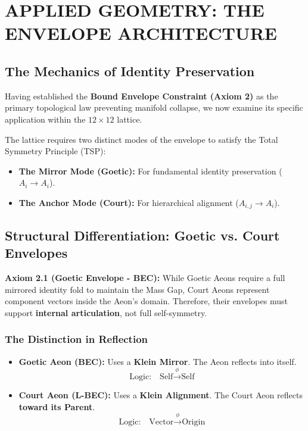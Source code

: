 \documentclass[11pt, letterpaper]{article}
\begin{document}
\section{APPLIED GEOMETRY: THE ENVELOPE ARCHITECTURE}\label{sec:partIX}
\label{sec:envelope_application}

\subsection{The Mechanics of Identity Preservation}\label{sec:9.1}
Having established the \textbf{Bound Envelope Constraint (Axiom 2)} as the primary topological law preventing manifold collapse, we now examine its specific application within the $12 \times 12$ lattice.

The lattice requires two distinct modes of the envelope to satisfy the Total Symmetry Principle (TSP):
\begin{itemize}
    \item \textbf{The Mirror Mode (Goetic):} For fundamental identity preservation ($A_i \to A_i$).
    \item \textbf{The Anchor Mode (Court):} For hierarchical alignment ($A_{i,j} \to A_i$).
\end{itemize}

\subsection{Structural Differentiation: Goetic vs. Court Envelopes}\label{sec:9.2}
\textbf{Axiom 2.1 (Goetic Envelope - BEC):}
While Goetic Aeons require a full mirrored identity fold to maintain the Mass Gap, Court Aeons represent component vectors inside the Aeon’s domain. Therefore, their envelopes must support \textbf{internal articulation}, not full self-symmetry.

\subsubsection{The Distinction in Reflection}\label{sec:9.2.1}
\begin{itemize}
    \item \textbf{Goetic Aeon (BEC):} Uses a \textbf{Klein Mirror}. The Aeon reflects into itself.
    \[ \text{Logic:} \quad \text{Self} \xrightarrow{\phi} \text{Self} \]
    \item \textbf{Court Aeon (L-BEC):} Uses a \textbf{Klein Alignment}. The Court Aeon reflects \textbf{toward its Parent}.
    \[ \text{Logic:} \quad \text{Vector} \xrightarrow{\phi} \text{Origin} \]
\end{itemize}
\end{document}
